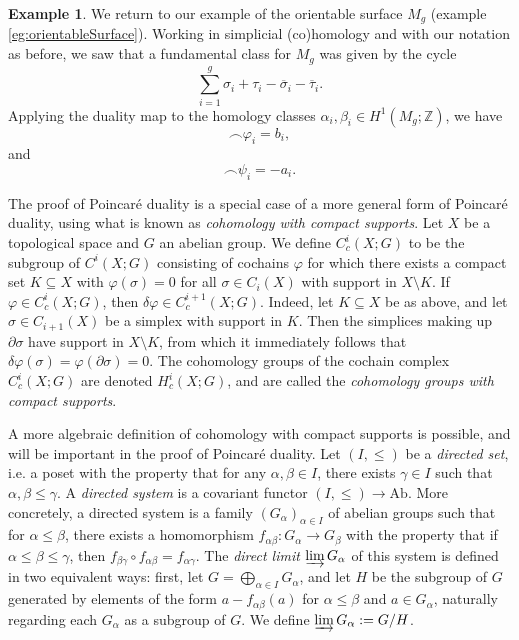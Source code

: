 \documentclass{book}
\newcommand{\bbZ}{\mathbb{Z}}
\renewcommand{\phi}{\varphi}
\theoremstyle{definition}
\newtheorem{example}[theorem]{Example}
\theoremstyle{remark}
\numberwithin{equation}{section}
\begin{document}
\begin{example}
    We return to our example of the orientable surface $M_g$ (example \ref{eg:orientableSurface}). Working in simplicial (co)homology and with our notation as before, we saw that a fundamental class for $M_g$ was given by the cycle
    \begin{equation}
        \sum_{i=1}^g \sigma_i + \tau_i - \overline{\sigma}_i - \overline{\tau}_i.
    \end{equation}
    Applying the duality map to the homology classes $\alpha_i, \beta_i \in H^1(M_g;\bbZ)$, we have 
    \begin{equation}
        [M_g] \frown \phi_i = b_i,
    \end{equation}
    and 
    \begin{equation}
        [M_g] \frown \psi_i = -a_i.
    \end{equation}
\end{example}

The proof of Poincar\'e duality is a special case of a more general form of Poincar\'e duality, using what is known as \textit{cohomology with compact supports}. Let $X$ be a topological space and $G$ an abelian group. We define $C_c^i(X;G)$ to be the subgroup of $C^i(X;G)$ consisting of cochains $\phi$ for which there exists a compact set $K \subseteq X$ with $\phi(\sigma) = 0$ for all $\sigma \in C_i(X)$ with support in $X \setminus K$. If $\phi \in C_c^i(X;G)$, then $\delta\phi \in C_c^{i+1}(X;G)$. Indeed, let $K \subseteq X$ be as above, and let $\sigma \in C_{i+1}(X)$ be a simplex with support in $K$. Then the simplices making up $\partial\sigma$ have support in $X \setminus K$, from which it immediately follows that $\delta\phi(\sigma) = \phi(\partial\sigma) = 0$. The cohomology groups of the cochain complex $C_c^i(X;G)$ are denoted $H_c^i(X;G)$, and are called the \textit{cohomology groups with compact supports}.

A more algebraic definition of cohomology with compact supports is possible, and will be important in the proof of Poincar\'e duality. Let $(I,\leq)$ be a \textit{directed set}, i.e. a poset with the property that for any $\alpha,\beta \in I$, there exists $\gamma \in I$ such that $\alpha,\beta \leq \gamma$. A \textit{directed system} is a covariant functor $(I,\leq) \to \textrm{Ab}$. More concretely, a directed system is a family $(G_\alpha)_{\alpha \in I}$ of abelian groups such that for $\alpha \leq \beta$, there exists a homomorphism $f_{\alpha \beta} \colon G_\alpha \to G_\beta$ with the property that if $\alpha \leq \beta \leq \gamma$, then $f_{\beta \gamma} \circ f_{\alpha \beta} = f_{\alpha \gamma}$. The \textit{direct limit} $\varinjlim G_\alpha$ of this system is defined in two equivalent ways: first, let $G = \bigoplus_{\alpha \in I} G_\alpha$, and let $H$ be the subgroup of $G$ generated by elements of the form $a - f_{\alpha\beta}(a)$ for $\alpha \leq \beta$ and $a \in G_\alpha$, naturally regarding each $G_\alpha$ as a subgroup of $G$. We define $\varinjlim G_\alpha := G/H$. 
\end{document}
